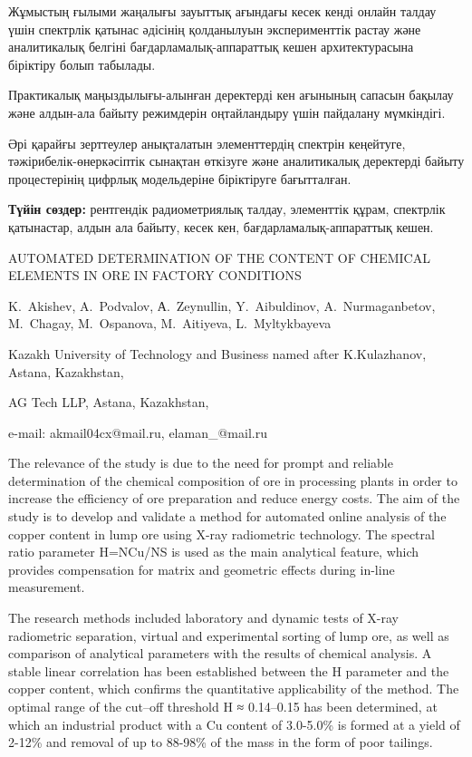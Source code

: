 Жұмыстың ғылыми жаңалығы зауыттық ағындағы кесек кенді онлайн талдау
үшін спектрлік қатынас әдісінің қолданылуын эксперименттік растау және
аналитикалық белгіні бағдарламалық-аппараттық кешен архитектурасына
біріктіру болып табылады.

Практикалық маңыздылығы-алынған деректерді кен ағынының сапасын бақылау
және алдын-ала байыту режимдерін оңтайландыру үшін пайдалану мүмкіндігі.

Әрі қарайғы зерттеулер анықталатын элементтердің спектрін кеңейтуге,
тәжірибелік-өнеркәсіптік сынақтан өткізуге және аналитикалық деректерді
байыту процестерінің цифрлық модельдеріне біріктіруге бағытталған.

{\bfseries Түйін сөздер:} рентгендік радиометриялық талдау, элементтік
құрам, спектрлік қатынастар, алдын ала байыту, кесек кен,
бағдарламалық-аппараттық кешен.

\begin{header}
AUTOMATED DETERMINATION OF THE CONTENT OF CHEMICAL ELEMENTS IN ORE IN FACTORY CONDITIONS

K.~Akishev\envelope,
A.~Podvalov,
А.~Zeynullin,
Y.~Aibuldinov\envelope,
A.~Nurmaganbetov,
M.~Chagay,
M.~Ospanova,
M.~Aitiyeva,
L.~Myltykbayeva
\end{header}

\begin{affil}
Kazakh University of Technology and Business named after K.Kulazhanov, Astana, Kazakhstan,

AG Tech LLP, Astana, Kazakhstan,

e-mail: akmail04cx@mail.ru, elaman\_@mail.ru
\end{affil}

The relevance of the study is due to the need for prompt and reliable
determination of the chemical composition of ore in processing plants in
order to increase the efficiency of ore preparation and reduce energy
costs. The aim of the study is to develop and validate a method for
automated online analysis of the copper content in lump ore using X-ray
radiometric technology. The spectral ratio parameter H=NCu/NS is used as
the main analytical feature, which provides compensation for matrix and
geometric effects during in-line measurement.

The research methods included laboratory and dynamic tests of X-ray
radiometric separation, virtual and experimental sorting of lump ore, as
well as comparison of analytical parameters with the results of chemical
analysis. A stable linear correlation has been established between the H
parameter and the copper content, which confirms the quantitative
applicability of the method. The optimal range of the cut--off threshold
H ≈ 0.14--0.15 has been determined, at which an industrial product with
a Cu content of 3.0-5.0\% is formed at a yield of 2-12\% and removal of
up to 88-98\% of the mass in the form of poor tailings.

